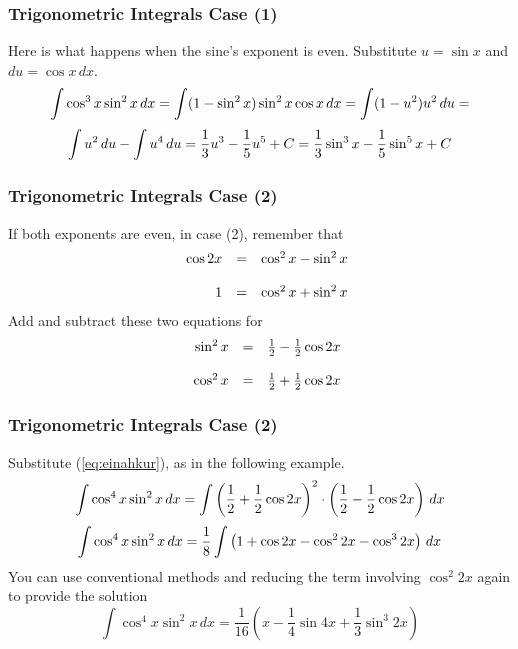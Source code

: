 \documentclass[xcolor=dvipsnames]{beamer}
\begin{document}
\begin{frame}
  \frametitle{Trigonometric Integrals Case (1)}
Here is what happens when the sine's exponent is even. Substitute $u=\sin{}x$ and $du=\cos{}x\,dx$.
\begin{equation}
  \label{eq:siengoel}
  \int\cos^{3}x\sin^{2}x\,dx=\int(1-\sin^{2}x)\sin^{2}x\cos{}x\,dx=\int(1-u^{2})u^{2}\,du=\notag
\end{equation}
\begin{equation}
  \label{eq:daejeile}
  \int{}u^{2}\,du-\int{}u^{4}\,du=\frac{1}{3}u^{3}-\frac{1}{5}u^{5}+C=\frac{1}{3}\sin^{3}x-\frac{1}{5}\sin^{5}x+C\notag
\end{equation}
\end{frame}

\begin{frame}
  \frametitle{Trigonometric Integrals Case (2)}
If both exponents are even, in case (2), remember that
  \begin{equation}
    \label{eq:ielahghu}
    \begin{array}{rcl}
      \cos{}2x & = & \cos^{2}x-\sin^{2}x \\
   \hspace{.5in} & & \\
      1 & = & \cos^{2}x+\sin^{2}x \\
    \end{array}
  \end{equation}
Add and subtract these two equations for
\begin{equation}
  \label{eq:einahkur}
  \begin{array}{rcl}
   \sin^{2}x & = & \frac{1}{2}-\frac{1}{2}\cos{}2x \\
   \hspace{.5in} & & \\
   \cos^{2}x & = & \frac{1}{2}+\frac{1}{2}\cos{}2x \\
  \end{array}
\end{equation}
\end{frame}

\begin{frame}
  \frametitle{Trigonometric Integrals Case (2)}
Substitute (\ref{eq:einahkur}), as in the following example.
\begin{equation}
  \label{eq:owamaela}
  \int\cos^{4}x\sin^{2}x\,dx=\int\left(\frac{1}{2}+\frac{1}{2}\cos{}2x\right)^{2}\cdot\left(\frac{1}{2}-\frac{1}{2}\cos{}2x\right)\,dx\notag
\end{equation}
\begin{equation}
  \label{eq:acahjahj}
  \int\cos^{4}x\sin^{2}x\,dx=\frac{1}{8}\int\left(1+\cos{}2x-\cos^{2}2x-\cos^{3}2x\right)\,dx\notag
\end{equation}
You can use conventional methods and reducing the term involving
$\cos^{2}2x$ again to provide the solution
\begin{equation}
  \label{eq:cohnalee}
  \int\cos^{4}x\sin^{2}x\,dx=\frac{1}{16}\left(x-\frac{1}{4}\sin{}4x+\frac{1}{3}\sin^{3}2x\right)
\end{equation}
\end{frame}
\end{document}
